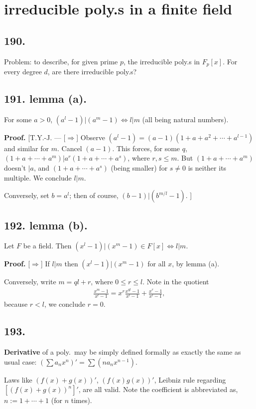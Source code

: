\documentclass[12pt]{article}
\newcommand\F\frac%
\newcommand{\Eq}{\Leftrightarrow}%
\newcommand{\Ip}{\Rightarrow} %
\newcommand{\Ss}[1]{\textsf{\bfseries{#1}}}%
\newcommand{\EqGo}[1]{ \begin{gather*}{#1}\end{gather*} } %
\begin{document}
\section{irreducible poly.s in a finite field }
\subsection*{190.} Problem: to describe, for given prime \(p\), the irreducible poly.s in \(F_p[x]\). 
For every degree \(d\), are there irreducible poly.s? 

\subsection*{191. lemma (a).} For some \(a>0\), \((a^l-1)|(a^m-1) \Eq l \Big| m\) (all being natural numbers). \par
\Ss{Proof.} [T.Y.-J. --- [\(\Ip\)] Observe \((a^l -1) =(a-1)(1+a+a^2+\dotsb+a^{l-1})\) and similar for \(m\). 
Cancel \((a-1)\). 
This forces, for some \(q\), \((1+a+\dotsb+a^m) \Big| a^r (1+a+\dotsb+a^s)\), where \(r,s \leq m\). 
But \((1+a+\dotsb+a^m)\) doesn't \(\Big| a\), and \((1+a+\dotsb+a^s)\) (being smaller) for \(s \neq 0\) is neither its multiple. 
We conclude \(l \Big| m\). \par
[\(\Leftarrow\)] Conversely, set \(b=a^l\); then of course, \((b-1)|(b^{m/l}-1)\). ]

\subsection*{192. lemma (b).} Let \(F\) be a field. 
Then \((x^l -1) \Big| (x^m -1) \in F[x] \Eq l \Big| m\). \par
\Ss{Proof.} [\(\Ip\)] If \(l|m\) then \((x^l-1) \Big| (x^m-1)\) for all \(x\), by lemma (a). \par
[\(\Leftarrow\)] Conversely, write \(m= ql +r\), where \(0 \leq r \leq l\). 
Note in the quotient \EqGo{
 \F{x^m-1}{x^l-1} = x^r \F{x^{ql}-1}{x^l-1} +\F{x^r-1}{x^l-1},
} because \(r<l\), we conclude \(r=0\). 

\subsection*{193.} \Ss{Derivative} of a poly.\ may be simply defined formally as exactly the same as usual case: \((\sum a_n x^n)' = \sum(n a_n x^{n-1})\). 

Laws like \((f(x)+g(x))'\), \((f(x)g(x))'\), Leibniz rule regarding \([(f(x)+g(x))^n]'\), are all valid. 
Note the coefficient is abbreviated as, \(n := 1+\dotsb+1\) (for \(n\) times).
\end{document}
